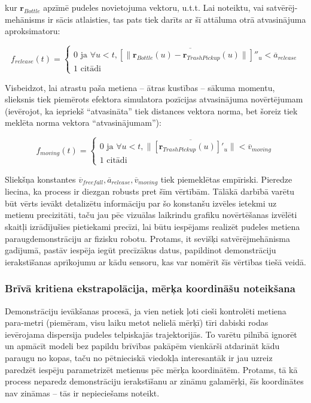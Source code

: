 \documentclass[12pt, a4paper]{article}
\numberwithin{equation}{section} %
\begin{document}
kur $ \boldsymbol{r}_{Bottle}$ apzīmē pudeles novietojuma vektoru, u.t.t. Lai noteiktu, vai satvērēj-mehānisms ir sācis atlaisties, tas pats tiek darīts ar šī attāluma otrā atvasinājuma aproksimatoru:


\begin{equation}
    f_{release} (t) = \begin{cases}
        0 \text{ ja } \forall u < t, \overline{ \left [ \lVert  \boldsymbol{r}_{Bottle}(u) -  \boldsymbol{r}_{TrashPickup}(u)  \rVert \right ] ''_u} < \overline{a}_{release} \\
        1 \text{ citādi }
    \end{cases}
\end{equation}

Visbeidzot, lai atrastu paša metiena -- ātras kustības -- sākuma momentu, slieksnis tiek piemērots efektora simulatora pozīcijas atvasinājuma novērtējumam (ievērojot, ka iepriekš ``atvasināta'' tiek distances vektora norma, bet šoreiz tiek meklēta norma vektora ``atvasinājumam''):

\begin{equation}
    f_{moving} (t) = \begin{cases}
        0 \text{ ja } \forall u < t,  \lVert \overline{\left [  \boldsymbol{r}_{TrashPickup}(u) \right ]'_u} \rVert  < \overline{v}_{moving} \\
        1 \text{ citādi }
    \end{cases}
\end{equation}

Sliekšņa konstantes $\overline{v}_{freefall}, \overline{a}_{release}, \overline{v}_{moving}$ tiek piemeklētas empīriski. Pieredze liecina, ka process ir diezgan robusts pret šīm vērtībām. Tālākā darbībā varētu būt vērts ievākt detalizētu informāciju par šo konstanšu izvēles ietekmi uz metienu precizitāti, taču jau pēc vizuālas laikrindu grafiku novērtēšanas izvēlēti skaitļi izrādījušies pietiekami precīzi, lai būtu iespējams realizēt pudeles metiena paraugdemonstrāciju ar fizisku robotu. Protams, it sevišķi satvērējmehānisma gadījumā, pastāv iespēja iegūt precīzākus datus, papildinot demonstrāciju ierakstīšanas aprīkojumu ar kādu sensoru, kas var nomērīt šīs vērtības tiešā veidā.

\subsubsection{Brīvā kritiena ekstrapolācija, mērķa koordināšu noteikšana}

Demonstrāciju ievākšanas procesā, ja vien netiek ļoti cieši kontrolēti metiena para-metri (piemēram, visu laiku metot nelielā mērķī) tīri dabiski rodas ievērojama dispersija pudeles telpiskajās trajektorijās. To varētu pilnībā ignorēt un apmācīt modeli bez papildu brīvības pakāpēm vienkārši atdarināt kādu paraugu no kopas, taču no pētnieciskā viedokļa interesantāk ir jau uzreiz paredzēt iespēju parametrizēt metienus pēc mērķa koordinātēm. Protams, tā kā process neparedz demonstrāciju ierakstīšanu ar zināmu galamērķi, šīs koordinātes nav zināmas -- tās ir nepieciešams noteikt.
\end{document}
